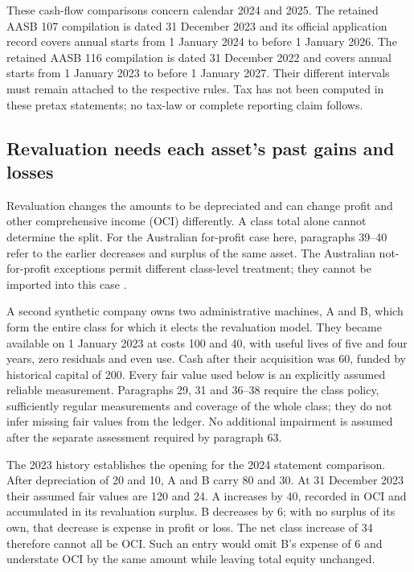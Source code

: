 These cash-flow comparisons concern calendar 2024 and 2025. The retained
AASB 107 compilation is dated 31 December 2023 and its official application
record covers annual starts from 1 January 2024 to before 1 January 2026.
The retained AASB 116 compilation is dated 31 December 2022 and covers annual
starts from 1 January 2023 to before 1 January 2027. Their different intervals
must remain attached to the respective rules. Tax has not been computed in
these pretax statements; no tax-law or complete reporting claim follows.

\subsection{Revaluation needs each asset's past gains and losses}
\label{sec:ppe-revaluation}

Revaluation changes the amounts to be depreciated and can change profit and
other comprehensive income (OCI) differently. A class total alone cannot
determine the split. For the Australian for-profit case here, paragraphs
39--40 refer to the earlier decreases and surplus of the same asset. The
Australian not-for-profit exceptions permit different class-level treatment;
they cannot be imported into this case \citep{aasb116dated}.

A second synthetic company owns two administrative machines, A and B, which
form the entire class for which it elects the revaluation model. They became
available on 1 January 2023 at costs 100 and 40, with useful lives of five
and four years, zero residuals and even use. Cash after their acquisition was
60, funded by historical capital of 200. Every fair value used below is an
explicitly assumed reliable measurement. Paragraphs 29, 31 and 36--38 require
the class policy, sufficiently regular measurements and coverage of the whole
class; they do not infer missing fair values from the ledger. No additional
impairment is assumed after the separate assessment required by paragraph 63.

The 2023 history establishes the opening for the 2024 statement comparison.
After depreciation of 20 and 10, A and B carry 80 and 30. At 31 December 2023
their assumed fair values are 120 and 24. A increases by 40, recorded in OCI
and accumulated in its revaluation surplus. B decreases by 6; with no surplus
of its own, that decrease is expense in profit or loss. The net class increase
of 34 therefore cannot all be OCI. Such an entry would omit B's expense of
6 and understate OCI by the same amount while leaving total equity unchanged.

